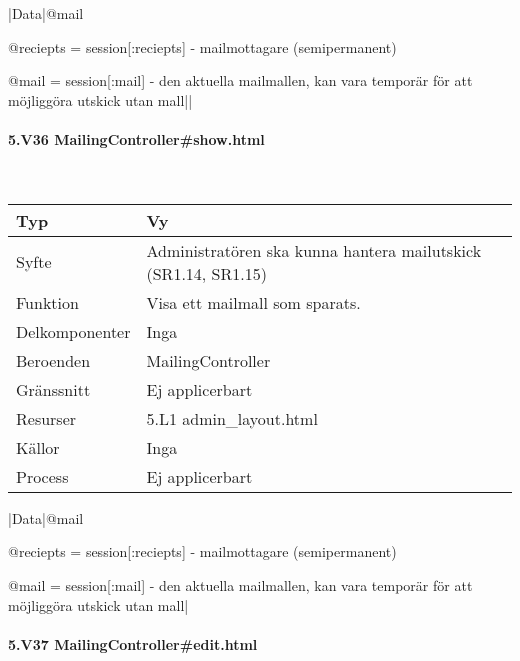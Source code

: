 \documentclass[a4paper, twoside, 11pt, titlepage]{article}
\begin{document}
			|Data|@mail

			@reciepts = session[:reciepts] - mailmottagare (semipermanent)

			@mail = session[:mail] - den aktuella mailmallen, kan vara temporär för att möjliggöra utskick utan mall||

			\paragraph{5.V36 MailingController\#show.html}\

			\begin {table} [ht] \begin{tabular} {  p{3.5cm} p{9.6cm} }
				\hline
				Typ & Vy  \\
				\hline
				Syfte & Administratören ska kunna hantera mailutskick (SR1.14, SR1.15)  \\
				\hline
				Funktion & Visa ett mailmall som sparats.   \\
				\hline
				Delkomponenter & Inga  \\
				\hline
				Beroenden & MailingController  \\
				\hline
				Gränssnitt & Ej applicerbart  \\
				\hline
				Resurser & 5.L1 admin\_layout.html  \\
				\hline
				Källor & Inga  \\
				\hline
				Process & Ej applicerbart  \\
				\hline
			\end{tabular} \end{table} \FloatBarrier
			\vspace{6mm}

			|Data|@mail

			@reciepts = session[:reciepts] - mailmottagare (semipermanent)

			@mail = session[:mail] - den aktuella mailmallen, kan vara temporär för att möjliggöra utskick utan mall|

			\paragraph{5.V37 MailingController\#edit.html}\
\end{document}
